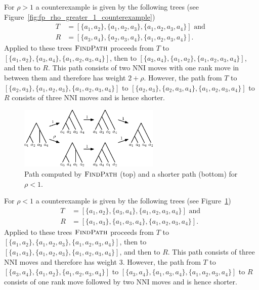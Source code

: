 \documentclass[11pt]{amsart}
\newcommand{\findpath}{\textsc{FindPath}}
\newcommand{\nni}{\mathrm{NNI}}
\begin{document}
\proof

For $\rho > 1$ a counterexample is given by the following trees (see Figure~\ref{fig:fp_rho_greater_1_counterexample})
\begin{align*}
	T &= [\{a_1,a_2\},\{a_1,a_2,a_3\},\{a_1,a_2,a_3,a_4\}]\text{ and }\\
	R &= [\{a_3,a_4\},\{a_2,a_3,a_4\},\{a_1,a_2,a_3,a_4\}].
\end{align*}
Applied to these trees $\findpath$ proceeds from $T$ to $[\{a_1,a_2\},\{a_3,a_4\},\{a_1,a_2,a_3,a_4\}]$, then to $[\{a_3,a_4\},\{a_1,a_2\},\{a_1,a_2,a_3,a_4\}]$, and then to $R$.
This path consists of two $\nni$ moves with one rank move in between them and therefore has weight $2 + \rho$.
However, the path from $T$ to $[\{a_2,a_3\},\{a_1,a_2,a_3\},\{a_1,a_2,a_3,a_4\}]$ to $[\{a_2,a_3\},\{a_2,a_3,a_4\},\{a_1,a_2,a_3,a_4\}]$ to $R$ consists of three $\nni$ moves and is hence shorter.

\begin{figure}[ht]
\centering
\includegraphics[width=0.6\textwidth]{fp_rho_less_1_counterexample}
\caption{Path computed by $\findpath$ (top) and a shorter path (bottom) for $\rho < 1$.}
\label{fig:fp_rho_less_1_counterexample}
\end{figure}

For $\rho < 1$ a counterexample is given by the following trees (see Figure~\ref{fig:fp_rho_less_1_counterexample})
\begin{align*}
	T &= [\{a_1,a_2\},\{a_3,a_4\},\{a_1,a_2,a_3,a_4\}]\text{ and }\\
	R &= [\{a_1,a_3\},\{a_1,a_3,a_4\},\{a_1,a_2,a_3,a_4\}].
\end{align*}
Applied to these trees $\findpath$ proceeds from $T$ to $[\{a_1,a_2\},\{a_1,a_2,a_3\},\{a_1,a_2,a_3,a_4\}]$, then to $[\{a_1,a_3\},\{a_1,a_2,a_3\},\{a_1,a_2,a_3,a_4\}]$, and then to $R$.
This path consists of three $\nni$ moves and therefore has weight $3$.
However, the path from $T$ to $[\{a_3, a_4\},\{a_1, a_2\},\{a_1, a_2, a_3, a_4\}]$ to $[\{a_3,a_4\},\{a_1, a_3, a_4\},\{a_1, a_2, a_3, a_4\}]$ to $R$ consists of one rank move followed by two $\nni$ moves and is hence shorter.
\endproof
\end{document}
